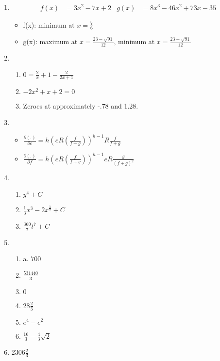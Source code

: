 \documentclass[11pt]{article}
\begin{document}
\begin{enumerate}
\item 
\begin{align*}
f(x) &= 3x^2 - 7x + 2 &  g(x) &= 8x^3 - 46x^2 + 73x - 35
\end{align*}
\begin{itemize}
\item f(x): minimum at $x=\frac{7}{6}$
\item g(x): maximum at $x=\frac{23-\sqrt{91}}{12}$, minimum at $x=\frac{23+\sqrt{91}}{12}$
\end{itemize}



\item 
\begin{enumerate}
\item $0 = \frac{2}{x} + 1 - \frac{2}{2x+1}$
\item $-2x^2 + x + 2 = 0$
\item Zeroes at approximately -.78 and 1.28.
\end{enumerate}




\item 
\begin{itemize}
\item $\frac{\partial(.)}{\partial e} = h(eR(\frac{f}{f+g}))^{h-1}R\frac{f}{f+g} $
\item $\frac{\partial(.)}{\partial f} =h(eR(\frac{f}{f+g}))^{h-1}eR\frac{g}{(f+g)^2} $
\end{itemize} 




\item 
  \begin{enumerate}
   \item $y^4 + C$
   \item $\frac{1}{3}x^3 - 2x^\frac{1}{2} + C$ 
   \item $\frac{360}{7}t^7 + C$
  \end{enumerate}



\item 
\begin{enumerate}
 \item a. $700$
 \item $\frac{531440}{3}$
 \item $0$
 \item $28\frac{2}{3}$ 
 \item $e^4 - e^2$
 \item $\frac{16}{3} - \frac{4}{3}\sqrt{2}$
\end{enumerate}





\item $2306\frac{2}{3}$




\end{enumerate}
\end{document}
